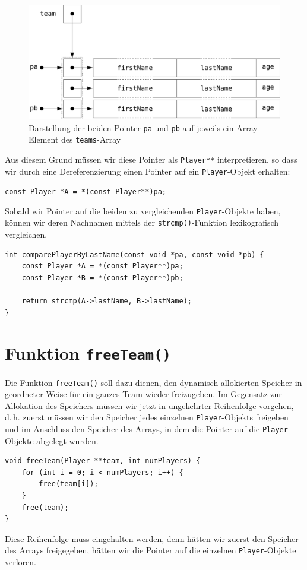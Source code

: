 \begin{figure}[htb!]
    \centering
    \includegraphics[scale=0.7]{images/sortPlayersCompareExample.pdf}
    \caption{Darstellung der beiden Pointer \texttt{pa} und
    \texttt{pb} auf jeweils ein Array-Element des
    \texttt{teams}-Array}
    \label{fig:sortPlayerCompareExample}
\end{figure}

Aus diesem Grund müssen wir diese Pointer als \texttt{Player**}
interpretieren, so dass wir durch eine Dereferenzierung einen Pointer auf ein
\texttt{Player}-Objekt erhalten:

\noindent\texttt{const Player *A = *(const Player**)pa;}

Sobald wir Pointer auf die beiden zu vergleichenden
\texttt{Player}-Objekte haben, können wir deren Nachnamen mittels der
\texttt{strcmp()}-Funktion lexikografisch vergleichen.

\begin{verbatim}
int comparePlayerByLastName(const void *pa, const void *pb) {
    const Player *A = *(const Player**)pa;
    const Player *B = *(const Player**)pb;

    return strcmp(A->lastName, B->lastName);
}
\end{verbatim}

\section*{Funktion \texttt{freeTeam()}}

Die Funktion \texttt{freeTeam()} soll dazu dienen, den dynamisch
allokierten Speicher in geordneter Weise für ein ganzes Team wieder freizugeben.
Im Gegensatz zur Allokation des Speichers müssen wir jetzt in ungekehrter
Reihenfolge vorgehen, d.\,h. zuerst müssen wir den Speicher jedes einzelnen
\texttt{Player}-Objekts freigeben und im Anschluss den Speicher des
Arrays, in dem die Pointer auf die \texttt{Player}-Objekte abgelegt
wurden.

\begin{verbatim}
void freeTeam(Player **team, int numPlayers) {
    for (int i = 0; i < numPlayers; i++) {
        free(team[i]);
    }
    free(team);
}
\end{verbatim}

Diese Reihenfolge muss eingehalten werden, denn hätten wir zuerst den Speicher
des Arrays freigegeben, hätten wir die Pointer auf die einzelnen
\texttt{Player}-Objekte verloren.
